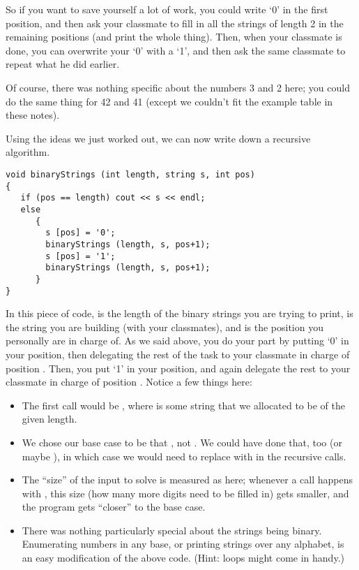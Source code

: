 So if you want to save yourself a lot of work, you could write `0' in
the first position, and then ask your classmate to fill in all the
strings of length 2 in the remaining positions
(and print the whole thing).
Then, when your classmate is done, you can overwrite your `0' with a
`1', and then ask the same classmate to repeat what he did earlier.

Of course, there was nothing specific about the numbers 3 and 2 here;
you could do the same thing for 42 and 41
(except we couldn't fit the example table in these notes).

Using the ideas we just worked out, we can now write down a recursive
algorithm.

\begin{verbatim}
void binaryStrings (int length, string s, int pos)
{
   if (pos == length) cout << s << endl;
   else
      {
        s [pos] = '0';
        binaryStrings (length, s, pos+1);
        s [pos] = '1';
        binaryStrings (length, s, pos+1);
      }
}
\end{verbatim}

In this piece of code,  is the length of the binary
strings you are trying to print,
 is the string you are building (with your classmates),
and  is the position you personally are in charge of.
As we said above, you do your part by putting `0' in your position,
then delegating the rest of the task to your classmate in charge of
position .
Then, you put `1' in your position, and again delegate the rest to
your classmate in charge of position .
Notice a few things here:
\begin{itemize}
  \item The first call would be ,
    where  is some string that we allocated to be of the given
    length.
  \item We chose our base case to be that , not
    .
    We could have done that, too (or maybe ),
    in which case we would need to replace  with
     in the recursive calls.
  \item The ``size'' of the input to solve is measured as
     here; whenever a call happens with ,
    this size (how many more digits need to be filled in) gets
    smaller, and the program gets ``closer'' to the base case.
  \item There was nothing particularly special about the strings being
    binary. Enumerating numbers in any base, or printing strings over
    any alphabet, is an easy modification of the above code.
    (Hint:  loops might come in handy.)
\end{itemize}

